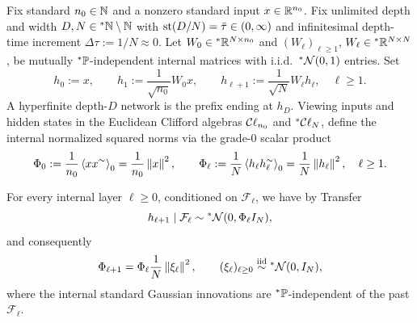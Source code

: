 Fix standard $n_0 \in \mathbb{N}$ and a nonzero standard input $x \in \mathbb{R}^{n_0}$. Fix unlimited depth and width $D, N \in {}^*\mathbb{N} \setminus \mathbb{N}$ with $\operatorname{st}(D/N) = \bar{\tau} \in (0, \infty)$ and infinitesimal depth-time increment $\Delta\tau := 1/N \approx 0$. Let $W_0 \in {}^*\mathbb{R}^{N \times n_0}$ and $(W_\ell)_{\ell \ge 1}$, $W_\ell \in {}^*\mathbb{R}^{N \times N}$, be mutually ${}^*\mathbb{P}$-independent internal matrices with i.i.d.\ ${}^*\mathcal{N}(0, 1)$ entries. Set
\begin{equation}\label{eq:deep_linear_net}
h_0 := x, \qquad h_1 := \frac{1}{\sqrt{n_0}} W_0 x, \qquad h_{\ell+1} := \frac{1}{\sqrt{N}} W_\ell h_\ell, \quad \ell \ge 1.
\end{equation}
A hyperfinite depth-$D$ network is the prefix ending at $h_D$. Viewing inputs and hidden states in the Euclidean Clifford algebras $\mathcal{C}\ell_{n_0}$ and ${}^*\mathcal{C}\ell_N$, define the internal normalized squared norms via the grade-$0$ scalar product
\begin{equation}\label{eq:scalar_phi_def}
\Phi_0 := \frac{1}{n_0}\left\langle xx^{\sim} \right\rangle_0 = \frac{1}{n_0}\left\lVert x \right\rVert^2, \qquad \Phi_\ell := \frac{1}{N}\left\langle h_\ell h_\ell^{\sim} \right\rangle_0 = \frac{1}{N}\left\lVert h_\ell \right\rVert^2, \quad \ell \ge 1.
\end{equation}

\begin{lemma}\label{lem:mult_var_recursion}
For every internal layer $\ell \ge 0$, conditioned on $\mathcal{F}_\ell$, we have by Transfer
\begin{equation}\label{eq:cond_gauss_linear}
h_{\ell+1} \mid \mathcal{F}_\ell \sim {}^*\mathcal{N}(0, \Phi_\ell I_N),
\end{equation}
and consequently
\begin{equation}\label{eq:mult_var_step}
\Phi_{\ell+1} = \Phi_\ell \frac{1}{N}\left\lVert \xi_\ell \right\rVert^2, \qquad (\xi_\ell)_{\ell \ge 0} \overset{\mathrm{iid}}{\sim} {}^*\mathcal{N}(0, I_N),
\end{equation}
where the internal standard Gaussian innovations are ${}^*\mathbb{P}$-independent of the past $\mathcal{F}_\ell$.
\end{lemma}

